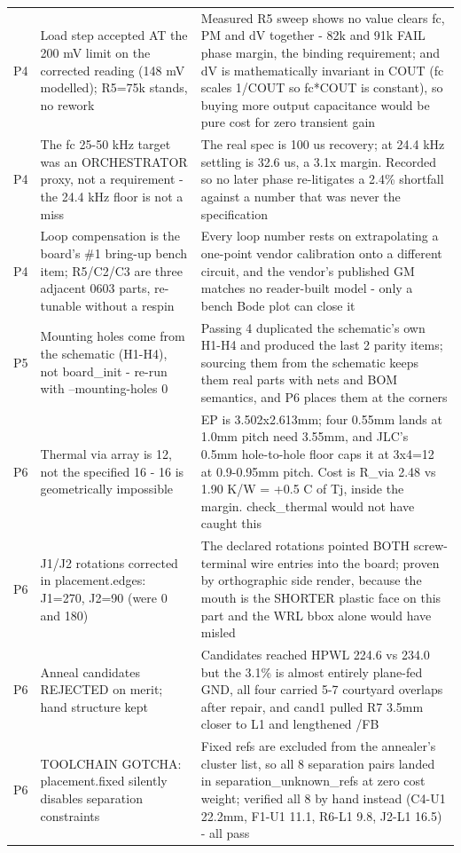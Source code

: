 \documentclass[11pt,a4paper]{article}
\begin{document}
{\begin{longtable}{lp{5.2cm}p{7.2cm}}
P4 & Load step accepted AT the 200 mV limit on the corrected reading (148 mV modelled); R5=75k stands, no rework & Measured R5 sweep shows no value clears fc, PM and dV together - 82k and 91k FAIL phase margin, the binding requirement; and dV is mathematically invariant in COUT (fc scales 1/COUT so fc{*}COUT is constant), so buying more output capacitance would be pure cost for zero transient gain \\
P4 & The fc 25-50 kHz target was an ORCHESTRATOR proxy, not a requirement - the 24.4 kHz floor is not a miss & The real spec is 100 us recovery; at 24.4 kHz settling is 32.6 us, a 3.1x margin. Recorded so no later phase re-litigates a 2.4\% shortfall against a number that was never the specification \\
P4 & Loop compensation is the board's \#1 bring-up bench item; R5/C2/C3 are three adjacent 0603 parts, re-tunable without a respin & Every loop number rests on extrapolating a one-point vendor calibration onto a different circuit, and the vendor's published GM matches no reader-built model - only a bench Bode plot can close it \\
P5 & Mounting holes come from the schematic (H1-H4), not board\_init - re-run with --mounting-holes 0 & Passing 4 duplicated the schematic's own H1-H4 and produced the last 2 parity items; sourcing them from the schematic keeps them real parts with nets and BOM semantics, and P6 places them at the corners \\
P6 & Thermal via array is 12, not the specified 16 - 16 is geometrically impossible & EP is 3.502x2.613mm; four 0.55mm lands at 1.0mm pitch need 3.55mm, and JLC's 0.5mm hole-to-hole floor caps it at 3x4=12 at 0.9-0.95mm pitch. Cost is R\_via 2.48 vs 1.90 K/W = +0.5 C of Tj, inside the margin. check\_thermal would not have caught this \\
P6 & J1/J2 rotations corrected in placement.edges: J1=270, J2=90 (were 0 and 180) & The declared rotations pointed BOTH screw-terminal wire entries into the board; proven by orthographic side render, because the mouth is the SHORTER plastic face on this part and the WRL bbox alone would have misled \\
P6 & Anneal candidates REJECTED on merit; hand structure kept & Candidates reached HPWL 224.6 vs 234.0 but the 3.1\% is almost entirely plane-fed GND, all four carried 5-7 courtyard overlaps after repair, and cand1 pulled R7 3.5mm closer to L1 and lengthened /FB \\
P6 & TOOLCHAIN GOTCHA: placement.fixed silently disables separation constraints & Fixed refs are excluded from the annealer's cluster list, so all 8 separation pairs landed in separation\_unknown\_refs at zero cost weight; verified all 8 by hand instead (C4-U1 22.2mm, F1-U1 11.1, R6-L1 9.8, J2-L1 16.5) - all pass \\

\end{longtable}}
\end{document}
